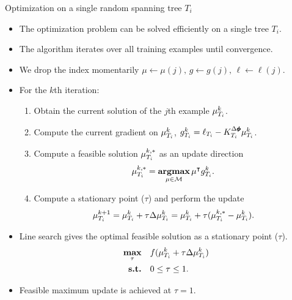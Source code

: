 \documentclass[first=dgreen,second=purple,logo=yellowexc]{aaltoslides}
\begin{document}
\begin{frame}{Optimization on a single random spanning tree $T_i$}
	\begin{itemize}\footnotesize
		\item The optimization problem can be solved efficiently on a single tree $T_i$. 
		\item The algorithm iterates over all training examples until convergence.
		\item We drop the index momentarily $\mu\leftarrow\mu(j),\,g\leftarrow g(j),\,\ell\leftarrow\ell(j)$.
		\item For the $k$th iteration:
		\begin{enumerate}\footnotesize
			\item Obtain the current solution of the $j$th example $\mathbf {\mu}_{T_i}^k$.
			\item Compute the current gradient on $\mathbf {\mu}_{T_i}^k$, $g_{T_i}^k = \ell_{T_i} - K^{\Delta\pmb \phi}_{T_i}\mathbf {\mu}_{T_i}^k$.
			\item Compute a feasible solution ${\mathbf {\mu}}_{T_i}^{k,*}$ as an update direction
			\begin{align*}
				{\mathbf {\mu}}_{T_i}^{k,*} = \underset{\mathbf {\mu}\in\mathcal{M}}{\textbf{argmax}}\,\mathbf {\mu}^{\intercal} g_{T_i}^k.
			\end{align*}
			\item Compute a stationary point ($\tau$) and perform the update
			\begin{align*}
				\mathbf {\mu}_{T_i}^{k+1} = \mathbf {\mu}_{T_i}^k + \tau\Delta\mathbf {\mu}_{T_i}^{k} =  \mathbf {\mu}_{T_i}^k + \tau({\mathbf {\mu}}_{T_i}^{k,*} - {\mathbf {\mu}}_{T_i}^{k}).
			\end{align*}
		\end{enumerate}
		\item Line search gives the optimal feasible solution as a stationary point ($\tau$).
		\begin{align*}
			\underset{\tau}{\textbf{max}} &\quad f(\mathbf {\mu}_{T_i}^k + \tau\Delta\mathbf {\mu}_{T_i}^{k})\\
			\textbf{s.t.} &\quad 0\le\tau\le1.
		\end{align*}
		\item Feasible maximum update is achieved at $\tau=1$.
	\end{itemize}
\end{frame}
\end{document}
